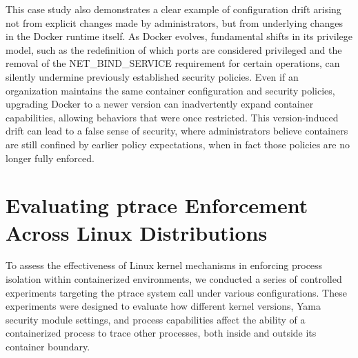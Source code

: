 \documentclass[12pt]{report}
\begin{document}
\begin{doublespace}
This case study also demonstrates a clear example of configuration drift arising not from explicit changes made by administrators, but from underlying changes in the Docker runtime itself. As Docker evolves, fundamental shifts in its privilege model, such as the redefinition of which ports are considered privileged and the removal of the NET\_BIND\_SERVICE requirement for certain operations, can silently undermine previously established security policies. Even if an organization maintains the same container configuration and security policies, upgrading Docker to a newer version can inadvertently expand container capabilities, allowing behaviors that were once restricted. This version-induced drift can lead to a false sense of security, where administrators believe containers are still confined by earlier policy expectations, when in fact those policies are no longer fully enforced.



















































\section{Evaluating ptrace Enforcement Across Linux Distributions}
\label{sec:evaluating-ptrace-enforcement-across-linux-distributions}

To assess the effectiveness of Linux kernel mechanisms in enforcing process isolation within containerized environments, we conducted a series of controlled experiments targeting the ptrace system call under various configurations. These experiments were designed to evaluate how different kernel versions, Yama security module settings, and process capabilities affect the ability of a containerized process to trace other processes, both inside and outside its container boundary.


\end{doublespace}
\end{document}
